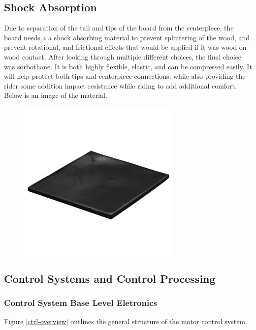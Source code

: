 \documentclass[letterpaper,12pt]{article}
\begin{document}
\subsection{Shock Absorption}
Due to separation of the tail and tips of the board from the centerpiece, the board needs a a shock absorbing material to prevent splintering of the wood, and prevent rotational, and frictional effects that would be applied if it was wood on wood contact. After looking through multiple different choices, the final choice was sorbothane. It is both highly flexible, elastic, and can be compressed easily. It will help protect both tips and centerpiece connections, while also providing the rider some addition impact resistance while riding to add additional comfort. Below is an image of the material.

\begin{figure}[!htbp]\centering
\begin{minipage}{.5\textwidth}\centering
\includegraphics[width=.8\textwidth]{sorbothane.jpg}
\label{sorbothane}
\end{minipage}
\end{figure}

\subsection{Control Systems and Control Processing}
\subsubsection{Control System Base Level Eletronics}
Figure \ref{ctrl-overview} outlines the general structure of the motor control system.
\end{document}
